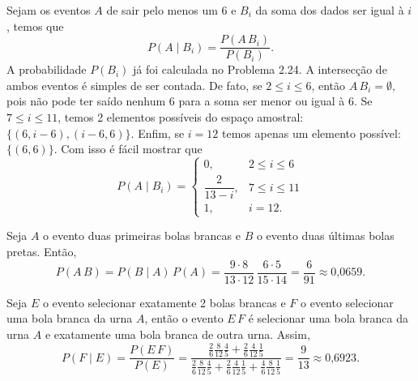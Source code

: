
\begin{questions}

\setcounter{question}{3}
\begin{solution}
	Sejam os eventos $A$ de sair pelo menos um 6 e $B_i$ da soma dos dados ser igual à $i$, temos que
    \[P(A\mid B_i) = \dfrac{P(A\,B_i)}{P(B_i)}.\]
    A probabilidade $P(B_i)$ já foi calculada no Problema 2.24. A intersecção de ambos eventos é simples de ser contada. De fato, se $2 \le i \le 6$, então $A\,B_i = \emptyset$, pois não pode ter saído nenhum 6 para a soma ser menor ou igual à 6. Se $7 \le i \le 11$, temos 2 elementos possíveis do espaço amostral: $\{(6,i-6),(i-6,6)\}$. Enfim, se $i = 12$ temos apenas um elemento possível: $\{(6,6)\}$. Com isso é fácil mostrar que
    \[P(A\mid B_i) = \begin{cases}
		 0, & 2\leq i\leq 6\\[3mm]
         \dfrac{2}{13-i}, & 7\leq i\leq 11\\[3mm]
         1, & i = 12.
	\end{cases}\]
\end{solution}

\begin{solution}
	Seja $A$ o evento duas primeiras bolas brancas e $B$ o evento duas últimas bolas pretas. Então,
    \[P(A\,B) = P(B\mid A)\,P(A)
    	= \dfrac{9\cdot 8}{13\cdot 12}\,\dfrac{6\cdot 5}{15\cdot 14}
        = \dfrac{6}{91} \approx \text{0,0659}.\]
\end{solution}

\setcounter{question}{8}
\begin{solution}
	Seja $E$ o evento selecionar exatamente 2 bolas brancas e $F$ o evento selecionar uma bola branca da urna $A$, então o evento $E\,F$ é selecionar uma bola branca da urna $A$ e exatamente uma bola branca de outra urna. Assim,
    \[P(F\mid E) = \dfrac{P(E\,F)}{P(E)}
    	= \dfrac{\frac{2}{6}\frac{8}{12}\frac{4}{5}
        	+ \frac{2}{6}\frac{4}{12}\frac{1}{5}}
            {\frac{2}{6}\frac{8}{12}\frac{4}{5}
        	+ \frac{2}{6}\frac{4}{12}\frac{1}{5}
            + \frac{4}{6}\frac{8}{12}\frac{1}{5}}
		= \dfrac{9}{13} \approx \text{0,6923}.\]
\end{solution}


\end{questions}
